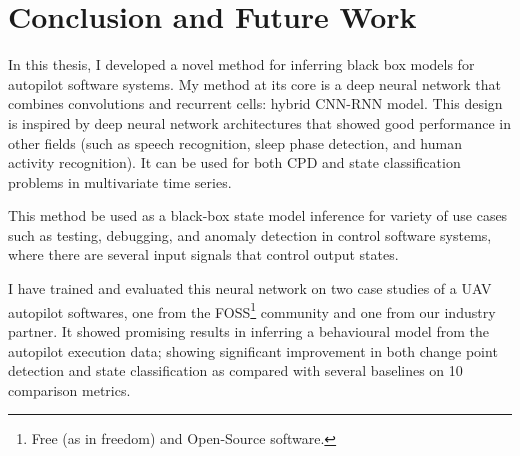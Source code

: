 \chapter{Conclusion and Future Work}\label{sec:summary} \label{sec:future_work}

In this thesis, I developed a novel method for inferring black box models for autopilot software systems.
My method at its core is a deep neural network that combines convolutions and recurrent cells: hybrid CNN-RNN model. 
This design is inspired by deep neural network architectures that showed good performance in other fields (such as speech recognition, sleep phase detection, and human activity recognition). 
It can be used for both CPD and state classification problems in multivariate time series. 

This method be used as a black-box state model inference for variety of use cases such as testing, debugging, and anomaly detection in control software systems, where there are several input signals that control output states. 

I have trained and evaluated this neural network on two case studies of a UAV autopilot softwares, one from the FOSS\footnote{Free (as in freedom) and Open-Source software.} community and one from our industry partner.
It showed promising results in inferring a behavioural model from the autopilot execution data; showing significant improvement in both change point detection and state classification as compared with several baselines on 10 comparison metrics.


